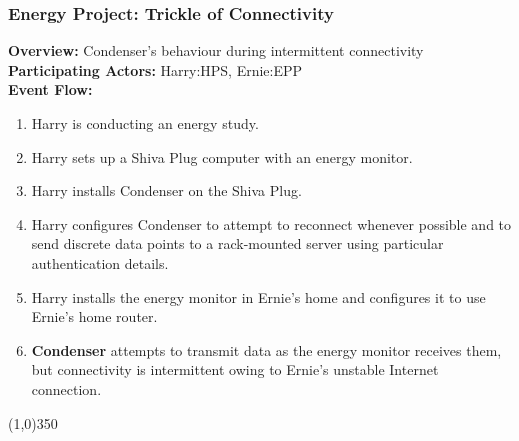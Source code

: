 	\subsubsection{Energy Project: Trickle of Connectivity}
			\textbf{Overview:} Condenser's behaviour during intermittent connectivity \\
			\textbf{Participating Actors:}  Harry:HPS, Ernie:EPP \\
\textbf{Event Flow:}
	\begin{enumerate}
\item Harry is conducting an energy study.
\item Harry sets up a Shiva Plug computer with an energy monitor.
\item Harry installs Condenser on the Shiva Plug.
\item Harry configures Condenser to attempt to reconnect whenever possible and to send discrete data points to a rack-mounted server using particular authentication details. 
\item  Harry installs the energy monitor in Ernie's home and configures it to use Ernie's home router.
\item \textbf{Condenser} attempts to transmit data as the energy monitor receives them, but connectivity is intermittent owing to Ernie's unstable Internet connection.
	\end{enumerate}
	\line(1,0){350}